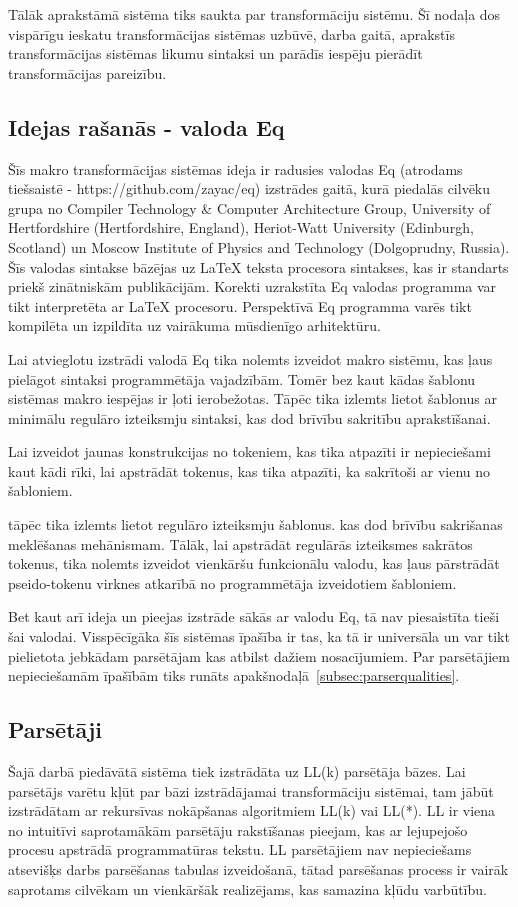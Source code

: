 Tālāk aprakstāmā sistēma tiks saukta par transformāciju sistēmu. Šī nodaļa dos vispārīgu ieskatu transformācijas sistēmas uzbūvē, darba gaitā, aprakstīs transformācijas sistēmas likumu sintaksi un parādīs iespēju pierādīt transformācijas pareizību.

\subsection{Idejas rašanās - valoda Eq}
Šīs makro transformācijas sistēmas ideja ir radusies valodas Eq (atrodams tiešsaistē - https://github.com/zayac/eq) izstrādes gaitā, kurā piedalās cilvēku grupa no Compiler Technology \& Computer Architecture Group, University of Hertfordshire (Hertfordshire, England), Heriot-Watt University (Edinburgh, Scotland) un Moscow Institute of Physics and Technology (Dolgoprudny, Russia). Šīs valodas sintakse bāzējas uz \LaTeX{} teksta procesora sintakses, kas ir standarts priekš zinātniskām publikācijām. Korekti uzrakstīta Eq valodas programma var tikt interpretēta ar \LaTeX{} procesoru. Perspektīvā Eq programma varēs tikt kompilēta un izpildīta uz vairākuma mūsdienīgo arhitektūru. 

Lai atvieglotu izstrādi valodā Eq tika nolemts izveidot makro sistēmu, kas ļaus pielāgot sintaksi programmētāja vajadzībām. Tomēr bez kaut kādas šablonu sistēmas makro iespējas ir ļoti ierobežotas. Tāpēc tika izlemts lietot šablonus ar minimālu regulāro izteiksmju sintaksi, kas dod brīvību sakritību aprakstīšanai. 

Lai izveidot jaunas konstrukcijas no tokeniem, kas tika atpazīti ir nepieciešami kaut kādi rīki, lai apstrādāt tokenus, kas tika atpazīti, ka sakrītoši ar vienu no šabloniem. 

 tāpēc tika izlemts lietot regulāro izteiksmju šablonus.  kas dod brīvību sakrišanas meklēšanas mehānismam. Tālāk, lai apstrādāt regulārās izteiksmes sakrātos tokenus, tika nolemts izveidot vienkāršu funkcionālu valodu, kas ļaus pārstrādāt pseido-tokenu virknes atkarībā no programmētāja izveidotiem šabloniem.

Bet kaut arī ideja un pieejas izstrāde sākās ar valodu Eq, tā nav piesaistīta tieši šai valodai. Visspēcīgāka šīs sistēmas īpašība ir tas, ka tā ir universāla un var tikt pielietota jebkādam parsētājam kas atbilst dažiem nosacījumiem. Par parsētājiem nepieciešamām īpašībām tiks runāts apakšnodaļā~\ref{subsec:parserqualities}.

\subsection{\label{subsec:parserqualities}Parsētāji}
Šajā darbā piedāvātā sistēma tiek izstrādāta uz LL(k) parsētāja bāzes. 
Lai parsētājs varētu kļūt par bāzi izstrādājamai transformāciju sistēmai, tam jābūt izstrādātam ar rekursīvas nokāpšanas algoritmiem LL(k) vai LL(*). LL ir viena no intuitīvi saprotamākām parsētāju rakstīšanas pieejam, kas ar lejupejošo procesu apstrādā programmatūras tekstu. LL parsētājiem nav nepieciešams atsevišķs darbs parsēšanas tabulas izveidošanā, tātad parsēšanas process ir vairāk saprotams cilvēkam un vienkāršāk realizējams, kas samazina kļūdu varbūtību. 

